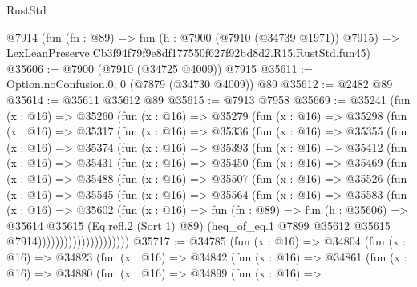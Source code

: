 \begin{lexlean}{RustStd}
\begin{coremodule}
    @7914
    (fun (fn : @89) =>
    fun (h : @7900 (@7910 (@34739 @1971)) @7915) =>
    LexLeanPreserve.Cb3f94f79f9e8df177550f627f92bd8d2.R15.RustStd.fun45)
@35606 := @7900 (@7910 (@34725 @4009)) @7915
@35611 := Option.noConfusion.{0, 0} (@7879 (@34730 @4009)) @89
@35612 := @2482 @89
@35614 := @35611 @35612 @89
@35615 := @7913 @7958
@35669 := @35241
    (fun (x : @16) =>
    @35260
      (fun (x : @16) =>
      @35279
        (fun (x : @16) =>
        @35298
          (fun (x : @16) =>
          @35317
            (fun (x : @16) =>
            @35336
              (fun (x : @16) =>
              @35355
                (fun (x : @16) =>
                @35374
                  (fun (x : @16) =>
                  @35393
                    (fun (x : @16) =>
                    @35412
                      (fun (x : @16) =>
                      @35431
                        (fun (x : @16) =>
                        @35450
                          (fun (x : @16) =>
                          @35469
                            (fun (x : @16) =>
                            @35488
                              (fun (x : @16) =>
                              @35507
                                (fun (x : @16) =>
                                @35526
                                  (fun (x : @16) =>
                                  @35545
                                    (fun (x : @16) =>
                                    @35564
                                      (fun (x : @16) =>
                                      @35583
                                        (fun (x : @16) =>
                                        @35602
                                          (fun (x : @16) =>
                                          fun (fn : @89) =>
                                          fun (h : @35606) =>
                                          @35614
                                            @35615
                                            (Eq.refl.{2} (Sort 1) @89)
                                            (heq_of_eq.{1}
                                              @7899
                                              @35612
                                              @35615
                                              @7914)))))))))))))))))))))
@35717 := @34785
    (fun (x : @16) =>
    @34804
      (fun (x : @16) =>
      @34823
        (fun (x : @16) =>
        @34842
          (fun (x : @16) =>
          @34861
            (fun (x : @16) =>
            @34880
              (fun (x : @16) =>
              @34899
                (fun (x : @16) =>

\end{coremodule}
\end{lexlean}
